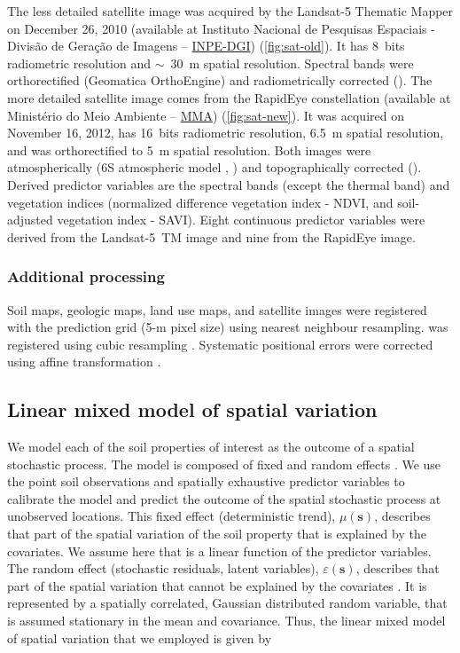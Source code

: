 The less detailed satellite image was acquired by the Landsat-5 Thematic Mapper on December 26, 2010 
(available at Instituto Nacional de Pesquisas Espaciais - Divisão de Geração de Imagens -- 
\href{http://www.dgi.inpe.br/CDSR/}{INPE-DGI}) (\autoref{fig:sat-old}). It has 8~bits radiometric resolution 
and $\sim$~30~m spatial resolution. Spectral bands were orthorectified (Geomatica\textregistered{}
OrthoEngine\textregistered{}) and radiometrically corrected (). The more detailed 
satellite image comes from the RapidEye constellation (available at Ministério do Meio Ambiente -- 
\href{http://geocatalogo.ibama.gov.br/}{MMA}) (\autoref{fig:sat-new}). It was acquired on November 16, 2012, 
has 16~bits radiometric resolution, 6.5~m spatial resolution, and was orthorectified to 5~m spatial resolution. 
Both images were atmospherically (6S atmospheric model \cite{VermoteEtAl1997}, ) and 
topographically corrected (). Derived predictor variables are the spectral bands (except 
the thermal band) and vegetation indices (normalized difference vegetation index - NDVI, and soil-adjusted 
vegetation index - SAVI). Eight continuous predictor variables were derived from the Landsat-5~TM image and 
nine from the RapidEye image.

\subsubsection*{Additional processing}
\label{subsubsec:sources-processing}

Soil maps, geologic maps, land use maps, and satellite images were registered with the prediction grid (5-m 
pixel size) using nearest neighbour resampling. \demOld{} was registered using cubic resampling 
\cite{Samuel-RosaEtAl2013c}. Systematic positional errors were corrected using affine transformation 
\cite{Samuel-RosaEtAl2014}.

\subsection{Linear mixed model of spatial variation}
\label{subsec:lmm}

We model each of the soil properties of interest as the outcome of a spatial stochastic process. The model is 
composed of fixed and random effects \cite{HeuvelinkEtAl2001, LarkEtAl2006}. We use the point soil observations 
and spatially exhaustive predictor variables to calibrate the model and predict the outcome of the spatial 
stochastic process at unobserved locations. This fixed effect (deterministic trend), $\mu(\textbf{s})$, 
describes that part of the spatial variation of the soil property that is explained by the covariates. We 
assume here that is a linear function of the predictor variables. The random effect (stochastic residuals, 
latent variables), $\varepsilon(\textbf{s})$, describes that part of the spatial variation that cannot be 
explained by the covariates \cite{Cressie1993}. It is represented by a spatially correlated, Gaussian 
distributed random variable, that is assumed stationary in the mean and covariance. Thus, the linear mixed 
model of spatial variation that we employed is given by

